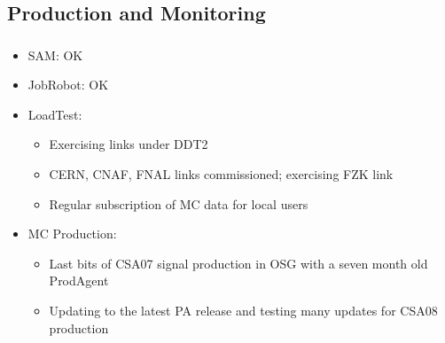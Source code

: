 \documentclass{beamer}
\begin{document}
\subsection{Production and Monitoring}
\begin{frame}
\frametitle{}
\begin{itemize}
    \item SAM: OK
    \item JobRobot: OK
    \item LoadTest:
    \begin{itemize}
        \item Exercising links under DDT2
        \item CERN, CNAF, FNAL links commissioned; exercising FZK link
        \item Regular subscription of MC data for local users
    \end{itemize}
    \item MC Production:
    \begin{itemize}
        \item Last bits of CSA07 signal production in OSG with a seven month old ProdAgent
        \item Updating to the latest PA release and testing many updates for CSA08 production
    \end{itemize}
\end{itemize}
\end{frame}
\end{document}
